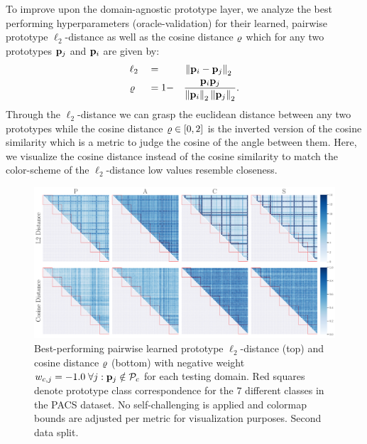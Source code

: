 To improve upon the domain-agnostic prototype layer, we analyze the best performing hyperparameters (oracle-validation) for their learned, pairwise prototype $\ell_2$-distance as well as the cosine distance $\varrho$ which for any two prototypes $\mathbf{p}_{j}$ and $\mathbf{p}_i$ are given by:
\begin{alignat}{3}
\label{eq:pairwise_prot_distances}
    &\ell_2 &&= &&\left\|\mathbf{p}_i - \mathbf{p}_{j}  \right\|_2\\ 
    &\varrho &&= 1- &&\frac{\mathbf{p}_i\mathbf{p}_{j}}{\left\|\mathbf{p}_i \right\|_2 \left\|\mathbf{p}_{j} \right\|_2} .
\end{alignat}
Through the $\ell_2$-distance we can grasp the euclidean distance between any two prototypes while the cosine distance $\varrho \in [0,2]$ is the inverted version of the cosine similarity which is a metric to judge the cosine of the angle between them. Here, we visualize the cosine distance instead of the cosine similarity to match the color-scheme of the $\ell_2$-distance \ie low values resemble closeness. 


\begin{figure}[t]
    \centering
    \includegraphics[width=\textwidth]{Figures/Chapter4/2021-01-21-ProDropIncorrectWeight-1.0SAVEResNet18oracle_validation_trial1.pdf}
    \caption[Second data split pairwise prototype distances with $w_{c,j} = -1.0$] {Best-performing pairwise learned prototype $\ell_2$-distance (top) and cosine distance $\varrho$ (bottom) with negative weight $w_{c,j} = -1.0\; \forall j: \mathbf{p}_{j} \notin \mathcal{P}_c$ for each testing domain. Red squares denote prototype class correspondence for the $7$ different classes in the PACS dataset. No self-challenging is applied and colormap bounds are adjusted per metric for visualization purposes. Second data split.}
    \label{fig:pw_distance_trial1}
\end{figure}


